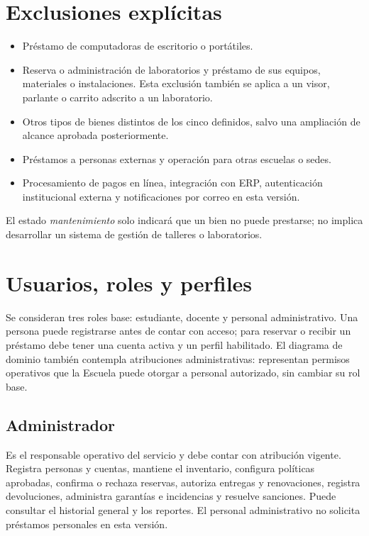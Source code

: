 \section{Exclusiones expl\'icitas}

\begin{itemize}
    \item Pr\'estamo de computadoras de escritorio o port\'atiles.
    \item Reserva o administraci\'on de laboratorios y pr\'estamo de sus equipos, materiales o instalaciones. Esta exclusi\'on tambi\'en se aplica a un visor, parlante o carrito adscrito a un laboratorio.
    \item Otros tipos de bienes distintos de los cinco definidos, salvo una ampliaci\'on de alcance aprobada posteriormente.
    \item Pr\'estamos a personas externas y operaci\'on para otras escuelas o sedes.
    \item Procesamiento de pagos en l\'inea, integraci\'on con ERP, autenticaci\'on institucional externa y notificaciones por correo en esta versi\'on.
\end{itemize}

El estado \emph{mantenimiento} solo indicar\'a que un bien no puede prestarse; no implica desarrollar un sistema de gesti\'on de talleres o laboratorios.

\section{Usuarios, roles y perfiles}
\label{sec:actores}

Se consideran tres roles base: estudiante, docente y personal administrativo. Una persona puede registrarse antes de contar con acceso; para reservar o recibir un pr\'estamo debe tener una cuenta activa y un perfil habilitado. El diagrama de dominio tambi\'en contempla atribuciones administrativas: representan permisos operativos que la Escuela puede otorgar a personal autorizado, sin cambiar su rol base.

\subsection{Administrador}

Es el responsable operativo del servicio y debe contar con atribuci\'on vigente. Registra personas y cuentas, mantiene el inventario, configura pol\'iticas aprobadas, confirma o rechaza reservas, autoriza entregas y renovaciones, registra devoluciones, administra garant\'ias e incidencias y resuelve sanciones. Puede consultar el historial general y los reportes. El personal administrativo no solicita pr\'estamos personales en esta versi\'on.

